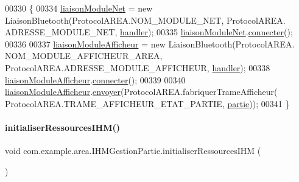 \begin{DoxyCode}
00330     \{
00334         \hyperlink{classcom_1_1example_1_1area_1_1_i_h_m_gestion_partie_a20e5bc638f1bd45e80bbadca8e8ec28f}{liaisonModuleNet} = \textcolor{keyword}{new} LiaisonBluetooth(ProtocolAREA.NOM\_MODULE\_NET, ProtocolAREA.
      ADRESSE\_MODULE\_NET, \hyperlink{classcom_1_1example_1_1area_1_1_i_h_m_gestion_partie_ace8429e695c3e7d695ba98bf2dcd66f2}{handler});
00335         \hyperlink{classcom_1_1example_1_1area_1_1_i_h_m_gestion_partie_a20e5bc638f1bd45e80bbadca8e8ec28f}{liaisonModuleNet}.\hyperlink{classcom_1_1example_1_1area_1_1_liaison_bluetooth_a7b9662a4224762b23c814d1f4539002a}{connecter}();
00336 
00337         \hyperlink{classcom_1_1example_1_1area_1_1_i_h_m_gestion_partie_a126a48e2f28ff098e20f0efb4700145f}{liaisonModuleAfficheur} = \textcolor{keyword}{new} LiaisonBluetooth(ProtocolAREA.
      NOM\_MODULE\_AFFICHEUR\_AREA, ProtocolAREA.ADRESSE\_MODULE\_AFFICHEUR, \hyperlink{classcom_1_1example_1_1area_1_1_i_h_m_gestion_partie_ace8429e695c3e7d695ba98bf2dcd66f2}{handler});
00338         \hyperlink{classcom_1_1example_1_1area_1_1_i_h_m_gestion_partie_a126a48e2f28ff098e20f0efb4700145f}{liaisonModuleAfficheur}.\hyperlink{classcom_1_1example_1_1area_1_1_liaison_bluetooth_a7b9662a4224762b23c814d1f4539002a}{connecter}();
00339 
00340         \hyperlink{classcom_1_1example_1_1area_1_1_i_h_m_gestion_partie_a126a48e2f28ff098e20f0efb4700145f}{liaisonModuleAfficheur}.\hyperlink{classcom_1_1example_1_1area_1_1_liaison_bluetooth_a67360b2f673b47b8a552a9e789a93fce}{envoyer}(ProtocolAREA.fabriquerTrameAfficheur(
      ProtocolAREA.TRAME\_AFFICHEUR\_ETAT\_PARTIE, \hyperlink{classcom_1_1example_1_1area_1_1_i_h_m_gestion_partie_a225e150f813f8fa5c632709a57eacc32}{partie}));
00341     \}
\end{DoxyCode}
\mbox{\label{classcom_1_1example_1_1area_1_1_i_h_m_gestion_partie_a7d67797752c3b0f4e0cab951c8e11e8d}} 
\paragraph{\texorpdfstring{initialiser\+Ressources\+I\+H\+M()}{initialiserRessourcesIHM()}}
{\footnotesize\ttfamily void com.\+example.\+area.\+I\+H\+M\+Gestion\+Partie.\+initialiser\+Ressources\+I\+HM (\begin{DoxyParamCaption}{ }\end{DoxyParamCaption})\hspace{0.3cm}{\ttfamily [private]}}



